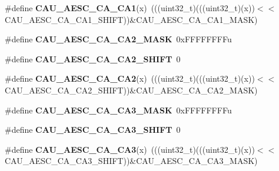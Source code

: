 \begin{DoxyCompactItemize}
\item 
\#define {\bfseries C\+A\+U\+\_\+\+A\+E\+S\+C\+\_\+\+C\+A\+\_\+\+C\+A1}(x)~(((uint32\+\_\+t)(((uint32\+\_\+t)(x))$<$$<$C\+A\+U\+\_\+\+A\+E\+S\+C\+\_\+\+C\+A\+\_\+\+C\+A1\+\_\+\+S\+H\+I\+FT))\&C\+A\+U\+\_\+\+A\+E\+S\+C\+\_\+\+C\+A\+\_\+\+C\+A1\+\_\+\+M\+A\+SK)\hypertarget{group__CAU__Register__Masks_gae92609b9dc76e27da2f6cec529382784}{}\label{group__CAU__Register__Masks_gae92609b9dc76e27da2f6cec529382784}

\item 
\#define {\bfseries C\+A\+U\+\_\+\+A\+E\+S\+C\+\_\+\+C\+A\+\_\+\+C\+A2\+\_\+\+M\+A\+SK}~0x\+F\+F\+F\+F\+F\+F\+F\+Fu\hypertarget{group__CAU__Register__Masks_ga228d26ca32382c1c7fc31336cab80532}{}\label{group__CAU__Register__Masks_ga228d26ca32382c1c7fc31336cab80532}

\item 
\#define {\bfseries C\+A\+U\+\_\+\+A\+E\+S\+C\+\_\+\+C\+A\+\_\+\+C\+A2\+\_\+\+S\+H\+I\+FT}~0\hypertarget{group__CAU__Register__Masks_gafb8c8ffc45b20809178af540f5c15280}{}\label{group__CAU__Register__Masks_gafb8c8ffc45b20809178af540f5c15280}

\item 
\#define {\bfseries C\+A\+U\+\_\+\+A\+E\+S\+C\+\_\+\+C\+A\+\_\+\+C\+A2}(x)~(((uint32\+\_\+t)(((uint32\+\_\+t)(x))$<$$<$C\+A\+U\+\_\+\+A\+E\+S\+C\+\_\+\+C\+A\+\_\+\+C\+A2\+\_\+\+S\+H\+I\+FT))\&C\+A\+U\+\_\+\+A\+E\+S\+C\+\_\+\+C\+A\+\_\+\+C\+A2\+\_\+\+M\+A\+SK)\hypertarget{group__CAU__Register__Masks_gaf72263318202db500bf3bd7d0caf0b0d}{}\label{group__CAU__Register__Masks_gaf72263318202db500bf3bd7d0caf0b0d}

\item 
\#define {\bfseries C\+A\+U\+\_\+\+A\+E\+S\+C\+\_\+\+C\+A\+\_\+\+C\+A3\+\_\+\+M\+A\+SK}~0x\+F\+F\+F\+F\+F\+F\+F\+Fu\hypertarget{group__CAU__Register__Masks_ga2acd3c4e0bdc22621d5a9992adcc571e}{}\label{group__CAU__Register__Masks_ga2acd3c4e0bdc22621d5a9992adcc571e}

\item 
\#define {\bfseries C\+A\+U\+\_\+\+A\+E\+S\+C\+\_\+\+C\+A\+\_\+\+C\+A3\+\_\+\+S\+H\+I\+FT}~0\hypertarget{group__CAU__Register__Masks_gacb3a23977b7f207a38793d67e7cf5691}{}\label{group__CAU__Register__Masks_gacb3a23977b7f207a38793d67e7cf5691}

\item 
\#define {\bfseries C\+A\+U\+\_\+\+A\+E\+S\+C\+\_\+\+C\+A\+\_\+\+C\+A3}(x)~(((uint32\+\_\+t)(((uint32\+\_\+t)(x))$<$$<$C\+A\+U\+\_\+\+A\+E\+S\+C\+\_\+\+C\+A\+\_\+\+C\+A3\+\_\+\+S\+H\+I\+FT))\&C\+A\+U\+\_\+\+A\+E\+S\+C\+\_\+\+C\+A\+\_\+\+C\+A3\+\_\+\+M\+A\+SK)\hypertarget{group__CAU__Register__Masks_gad446d55254acab1c4ae07a985e549450}{}\label{group__CAU__Register__Masks_gad446d55254acab1c4ae07a985e549450}


\end{DoxyCompactItemize}
